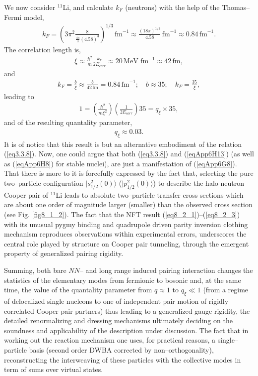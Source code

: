 \begin{subappendices}
We now consider $^{11}$Li, and calculate $k_F$ (neutrons) with the help of the Thomas--Fermi model, 
\begin{align}\label{eqApp6H9}
k_F=\left(3\pi^2\frac{8}{\frac{4\pi}{3}(4.58)^3}\right)^{1/3}\,\text{fm}^{-1}\approx\frac{(18\pi)^{1/3}}{4.58}\,\text{fm}^{-1}\approx 0.84\,\text{fm}^{-1}.
\end{align} 
The correlation length is,
\begin{align}\label{eqApp6H10}
\xi\approx\frac{\hbar^2}{m}\frac{k_F}{2E_{corr}}\approx 20\,\text{MeV fm}^{-1}\approx 42\,\text{fm},
\end{align} 
and
\begin{align}\label{eqApp6H11}
k_F=\frac{b}{\xi}\approx \frac{b}{42\,\text{fm}}=0.84\,\text{fm}^{-1};\quad b\approx 35; \quad k_F=\frac{35}{\xi},
\end{align} 
leading to
\begin{align}\label{eqApp6H12}
1=\left(\frac{\hbar^2}{m\xi^2}\right)\left(\frac{1}{2E_{corr}}\right)35=q_\xi\times 35,
\end{align}
and of the resulting quantality parameter,
\begin{align}\label{eqApp6H13}
q_\xi\approx 0.03.
\end{align}
It is of notice that this result is but an alternative embodiment of the relation (\ref{eq3.3.8}). Now, one could argue that both (\ref{eq3.3.8}) and (\ref{eqApp6H13}) (as well as (\ref{eqApp6H8}) for stable nuclei), are just a manifestation of (\ref{eqApp6G8}). That there is more to it is forcefully expressed by the fact that, selecting the pure two--particle configuration $|s_{1/2}^2(0)\rangle$ ($|p_{1/2}^2(0)\rangle$) to describe the halo neutron Cooper pair of $^{11}$Li leads to absolute two--particle transfer cross sections which are about one order of magnitude larger (smaller) than the observed cross section (see Fig. \ref{fig8_1_2}). The fact that the NFT result (\ref{eq8_2_1})--(\ref{eq8_2_3}) with its unusual pygmy binding and quadrupole driven parity inversion clothing mechanism reproduces observations within experimental errors, underscores the central role played by structure on Cooper pair tunneling, through the emergent property of generalized pairing rigidity.


Summing, both bare $NN$-- and long range induced pairing interaction changes the statistics of the elementary modes from fermionic to bosonic and, at the same time, the value of the quantality parameter from $q\approx1$ to $q_\xi\ll 1$ (from a regime of delocalized single nucleons to one of independent pair motion of rigidly correlated  Cooper pair partners) thus leading to a generalized gauge rigidity, the detailed renormalizing and dressing mechanisms ultimately deciding on the soundness and applicability of the description under discussion. The fact that in working out the reaction mechanism one uses, for practical reasons, a single--particle basis (second order DWBA corrected by non--orthogonality), reconstructing the interweaving of these particles with the collective modes in term of sums over virtual states.
 



\end{subappendices}

